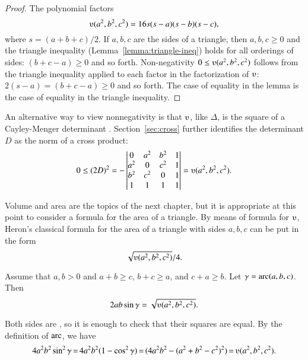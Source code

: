\begin{proof}
The polynomial factors
\begin{equation}\label{eqn:ups}
\ups(a^2,b^2,c^2) = 16 s (s-a) (s-b)
  (s-c),
\end{equation}
where $s = (a+b+c)/2$.  If $a,b,c$ are the sides of a triangle, then
$a,b,c\ge0$ and the triangle inequality (Lemma~\ref{lemma:triangle-ineq})
holds for all orderings of sides: $(b+c-a)\ge 0$ and so forth.
Non-negativity $0\le \ups(a^2,b^2,c^2)$ follows from the triangle
inequality applied to each factor in the factorization of $\ups$:
$2(s-a) = (b+c-a) \ge0$ and so forth.  The case of equality in the lemma is the
case of equality in the triangle inequality.
%
%
\end{proof}

An alternative way to view nonnegativity is
that $\ups$, like $\Delta$, is the square of a Cayley-Menger determinant
.  Section~\ref{sec:cross}  further identifies
the determinant $D$ as the norm of a cross product:
\[
0\le (2D)^2 = -
\left|\begin{matrix} 0 & a^2 & b^2 & 1\\ a^2 & 0 & c^2 & 1\\  b^2 & c^2 & 0 & 1\\
1 & 1 & 1& 1
\end{matrix}\right| = \ups(a^2,b^2,c^2).
\]


%
Volume and area are the topics of the next chapter, but it
is appropriate at this point to consider a formula for the area of a
triangle.  By means of formula  for $\ups$, Heron's classical formula
for the area of a triangle with sides $a,b,c$ can be put in the form
\[ \sqrt{\ups(a^2,b^2,c^2)}/4.\] 

\begin{lemma}\label{lemma:los}
Assume that $a,b>0$ and $a+b\ge c$, $b+c\ge a$, and $c+a\ge b$.
Let $\gamma=\operatorname{arc}(a,b,c)$.  Then
\[ 2 a b \sin\gamma =
  \sqrt{\ups(a^2,b^2,c^2)}.\] 
\end{lemma}
%
%
%
\begin{proved}
  Both sides are , so it is
  enough to check that their squares are equal.  By the definition of
  $\operatorname{arc}$, we have
\[ 
4 a^2 b^2 \sin^2\gamma 
\hypermark[lemma:circle]{\,=\,} 4 a^2 b^2 (1-\cos^2\gamma) 
\hypermark[lemma:loc]{\,=\,} (4 a^2 b^2 - (a^2 + b^2 -
c^2)^2) 
\hypermark[def:ups]{\,=\,} \ups(a^2,b^2,c^2).\] 
\swallowed\end{proved}

